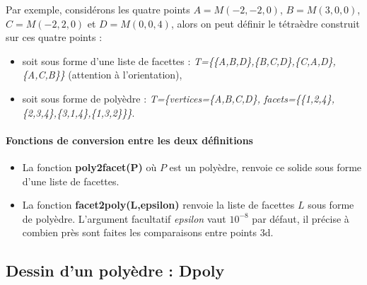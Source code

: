 Par exemple, considérons les quatre points $A=M(-2,-2,0)$, $B=M(3,0,0)$, $C=M(-2,2,0)$ et $D=M(0,0,4)$, alors on peut définir le tétraèdre construit sur ces quatre points :
\begin{itemize}
    \item soit sous forme d'une liste de facettes : \emph{T=\{\{A,B,D\},\{B,C,D\},\{C,A,D\},\{A,C,B\}\}} (attention à l'orientation),
    \item soit sous forme de polyèdre : 
    \emph{T=\{vertices=\{A,B,C,D\}, facets=\{\{1,2,4\},\{2,3,4\},\{3,1,4\},\{1,3,2\}\}\}}.
\end{itemize}

\paragraph{Fonctions de conversion entre les deux définitions}
\begin{itemize}
    \item La fonction \textbf{poly2facet(P)} où $P$ est un polyèdre, renvoie ce solide sous forme d'une liste de facettes.
    \item La fonction \textbf{facet2poly(L,epsilon)} renvoie la liste de facettes $L$ sous forme de polyèdre. L'argument facultatif \emph{epsilon} vaut $10^{-8}$ par défaut, il précise à combien près sont faites les comparaisons entre points 3d.
\end{itemize}

\subsection{Dessin d'un polyèdre : Dpoly}

